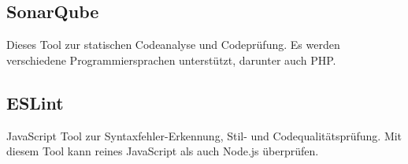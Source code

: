 \subsection{SonarQube}
Dieses Tool zur statischen Codeanalyse und Codeprüfung. Es werden verschiedene Programmiersprachen unterstützt, darunter auch PHP.

\subsection{ESLint}
JavaScript Tool zur Syntaxfehler-Erkennung, Stil- und Codequalitätsprüfung. Mit diesem Tool kann reines JavaScript als auch Node.js überprüfen.
